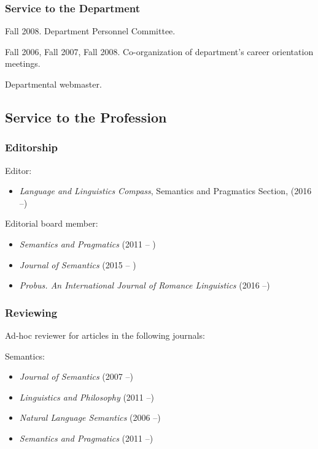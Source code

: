 \documentclass[11pt]{article}
\begin{document}
\subsubsection*{Service to the Department}

Fall 2008.  Department Personnel Committee.

Fall 2006, Fall 2007, Fall 2008. Co-organization of department's
career orientation meetings.

Departmental webmaster.

\subsection*{Service to the Profession}

\subsubsection*{Editorship}

Editor:

\begin{itemize}

\item[] \textit{Language and Linguistics Compass}, Semantics and Pragmatics Section, (2016 --)

\end{itemize}

Editorial board member: 

\begin{itemize}
  \item[] \textit{Semantics and Pragmatics} (2011 -- )
  \item[] \textit{Journal of Semantics} (2015 -- )
  \item[] \textit{Probus. An International Journal of Romance Linguistics} (2016 --)
\end{itemize}

\vspace{-10pt}

\subsubsection*{Reviewing}

Ad-hoc reviewer for articles in the following journals:

Semantics: 

\begin{itemize}
\item[] \textit{Journal of Semantics} (2007 --)
\item[] \textit{Linguistics and Philosophy} (2011 --)
\item[]\textit{Natural Language Semantics} (2006 --) 
\item[] \textit{Semantics and Pragmatics} (2011 --)
\end{itemize}
\end{document}
